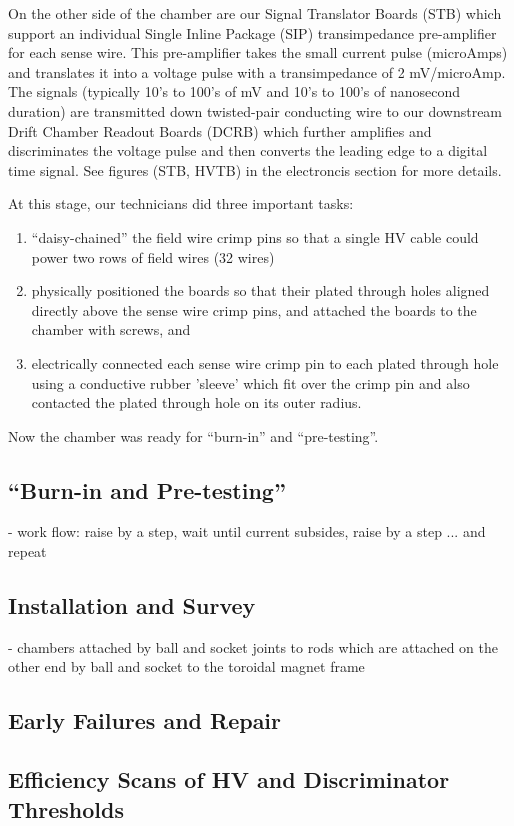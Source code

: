 On the other side of the chamber are our Signal Translator Boards (STB) 
which support an individual Single Inline Package (SIP) transimpedance
pre-amplifier for each sense wire.  This pre-amplifier takes the
small current pulse (microAmps) and translates it into a voltage 
pulse with a transimpedance of 2 mV/microAmp.  The signals (typically
10's to 100's of mV and 10's to 100's of nanosecond duration) are
transmitted down twisted-pair conducting wire to our downstream
Drift Chamber Readout Boards (DCRB) which further amplifies and
discriminates the voltage pulse and then converts the leading edge
to a digital time signal.
See figures (STB, HVTB) in the electroncis section for more details.

At this stage, our technicians did three important tasks:
\begin{enumerate}
\item ``daisy-chained'' the field wire crimp pins so that a single
HV cable could power two rows of field wires (32 wires)
\item physically positioned the boards so that their plated through
holes aligned directly above the sense wire crimp pins, and attached
the boards to the chamber with screws, and
\item electrically connected each sense wire crimp pin to each
plated through hole using a conductive rubber 'sleeve' which fit
over the crimp pin and also contacted the plated through hole on
its outer radius.
\end{enumerate}

Now the chamber was ready for ``burn-in'' and ``pre-testing''.

\subsection{``Burn-in and Pre-testing''}
- work flow: raise by a step, wait until current subsides, raise by
a step ... and repeat


\subsection{Installation and Survey}
- chambers attached by ball and socket joints to rods which are attached
on the other end by ball and socket to the toroidal magnet frame

\subsection{Early Failures and Repair}

\subsection{Efficiency Scans of HV and Discriminator Thresholds}
